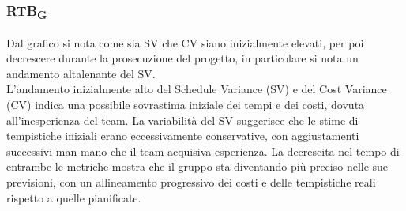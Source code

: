 \subsubsection*{\href{https://7last.github.io/docs/rtb/documentazione-interna/glossario\#requirements-and-technology-baseline}{RTB\textsubscript{G}}}
Dal grafico si nota come sia SV che CV siano inizialmente elevati, per poi decrescere durante la prosecuzione del progetto, in particolare si nota un andamento altalenante del SV. \\
L'andamento inizialmente alto del Schedule Variance (SV) e del Cost Variance (CV) indica una possibile sovrastima iniziale dei tempi e dei costi, dovuta all'inesperienza del team. La variabilità del SV suggerisce che le stime di tempistiche iniziali erano eccessivamente conservative, con aggiustamenti successivi man mano che il team acquisiva esperienza. La decrescita nel tempo di entrambe le metriche mostra che il gruppo sta diventando più preciso nelle sue previsioni, con un allineamento progressivo dei costi e delle tempistiche reali rispetto a quelle pianificate.


\newpage
